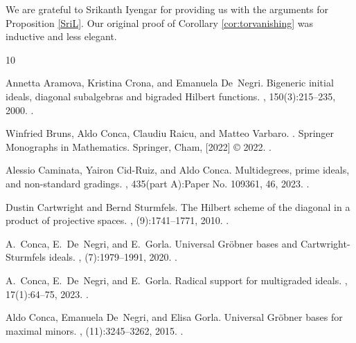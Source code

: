 \documentclass{amsart}
\theoremstyle{definition}
\numberwithin{equation}{section}
\begin{document}
We are grateful to Srikanth Iyengar for providing us with the arguments for
Proposition \ref{SriL}. Our original proof of Corollary \ref{cor:torvanishing} was inductive and less elegant. 




\begin{thebibliography}{10}

Annetta Aramova, Kristina Crona, and Emanuela De~Negri.
\newblock Bigeneric initial ideals, diagonal subalgebras and bigraded {H}ilbert
  functions.
, 150(3):215--235, 2000.
\newblock \href {https://doi.org/10.1016/S0022-4049(99)00100-0}
  {}.

Winfried Bruns, Aldo Conca, Claudiu Raicu, and Matteo Varbaro.
.
\newblock Springer Monographs in Mathematics. Springer, Cham, [2022] \copyright
  2022.
\newblock \href {https://doi.org/10.1007/978-3-031-05480-8}
  {}.

Alessio Caminata, Yairon Cid-Ruiz, and Aldo Conca.
\newblock Multidegrees, prime ideals, and non-standard gradings.
, 435(part A):Paper No. 109361, 46, 2023.
\newblock \href {https://doi.org/10.1016/j.aim.2023.109361}
  {}.

Dustin Cartwright and Bernd Sturmfels.
\newblock The {H}ilbert scheme of the diagonal in a product of projective
  spaces.
, (9):1741--1771, 2010.
\newblock \href {https://doi.org/10.1093/imrn/rnp201}
  {}.

A.~Conca, E.~De~Negri, and E.~Gorla.
\newblock Universal {G}r\"obner bases and {C}artwright-{S}turmfels ideals.
, (7):1979--1991, 2020.
\newblock \href {https://doi.org/10.1093/imrn/rny075}
  {}.

A.~Conca, E.~De~Negri, and E.~Gorla.
\newblock Radical support for multigraded ideals.
, 17(1):64--75, 2023.
\newblock \href {https://doi.org/10.1007/s40863-022-00318-8}
  {}.

Aldo Conca, Emanuela De~Negri, and Elisa Gorla.
\newblock Universal {G}r\"obner bases for maximal minors.
, (11):3245--3262, 2015.
\newblock \href {https://doi.org/10.1093/imrn/rnu032}
  {}.


\end{thebibliography}
\end{document}
